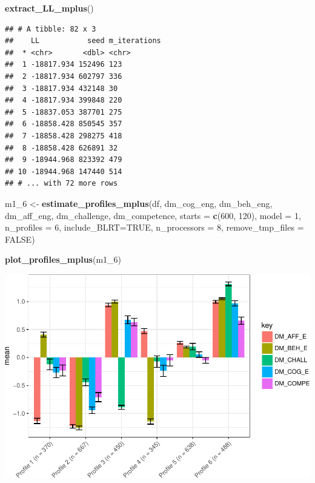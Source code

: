 \documentclass[]{book}
\newenvironment{Shaded}{\begin{snugshade}}{\end{snugshade}}
\newcommand{\KeywordTok}[1]{\textcolor[rgb]{0.13,0.29,0.53}{\textbf{#1}}}
\newcommand{\DataTypeTok}[1]{\textcolor[rgb]{0.13,0.29,0.53}{#1}}
\newcommand{\DecValTok}[1]{\textcolor[rgb]{0.00,0.00,0.81}{#1}}
\newcommand{\StringTok}[1]{\textcolor[rgb]{0.31,0.60,0.02}{#1}}
\newcommand{\OtherTok}[1]{\textcolor[rgb]{0.56,0.35,0.01}{#1}}
\newcommand{\NormalTok}[1]{#1}
\begin{document}
\begin{Shaded}
\begin{Highlighting}[]
\KeywordTok{extract_LL_mplus}\NormalTok{()}
\end{Highlighting}
\end{Shaded}

\begin{verbatim}
## # A tibble: 82 x 3
##    LL           seed m_iterations
##  * <chr>       <dbl> <chr>       
##  1 -18817.934 152496 123         
##  2 -18817.934 602797 336         
##  3 -18817.934 432148 30          
##  4 -18817.934 399848 220         
##  5 -18837.053 387701 275         
##  6 -18858.428 850545 357         
##  7 -18858.428 298275 418         
##  8 -18858.428 626891 32          
##  9 -18944.968 823392 479         
## 10 -18944.968 147440 514         
## # ... with 72 more rows
\end{verbatim}

\begin{Shaded}
\begin{Highlighting}[]
\NormalTok{m1_}\DecValTok{6}\NormalTok{ <-}\StringTok{ }\KeywordTok{estimate_profiles_mplus}\NormalTok{(df,  }
\NormalTok{                             dm_cog_eng, dm_beh_eng, dm_aff_eng, dm_challenge, dm_competence,}
                             \DataTypeTok{starts =} \KeywordTok{c}\NormalTok{(}\DecValTok{600}\NormalTok{, }\DecValTok{120}\NormalTok{),}
                             \DataTypeTok{model =} \DecValTok{1}\NormalTok{,}
                             \DataTypeTok{n_profiles =} \DecValTok{6}\NormalTok{,}
                             \DataTypeTok{include_BLRT=}\OtherTok{TRUE}\NormalTok{,}
                             \DataTypeTok{n_processors =} \DecValTok{8}\NormalTok{, }\DataTypeTok{remove_tmp_files =} \OtherTok{FALSE}\NormalTok{)}

\KeywordTok{plot_profiles_mplus}\NormalTok{(m1_}\DecValTok{6}\NormalTok{)}
\end{Highlighting}
\end{Shaded}

\includegraphics{rosenberg-dissertation_files/figure-latex/spec-solutions-model1-4.pdf}
\end{document}
